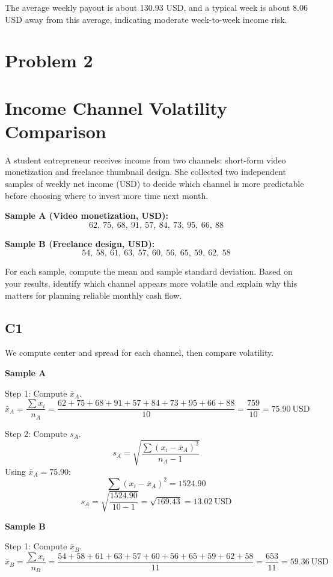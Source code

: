 \begin{ExamProblems}
		The average weekly payout is about 130.93 USD, and a typical week is about 8.06 USD away from this average, indicating moderate week-to-week income risk.

		\newpage
		\item
		\section{Problem 2}
		\section{Income Channel Volatility Comparison}
		A student entrepreneur receives income from two channels: short-form video monetization and freelance thumbnail design. She collected two independent samples of weekly net income (USD) to decide which channel is more predictable before choosing where to invest more time next month.

		\textbf{Sample A (Video monetization, USD):}
		\[62,\ 75,\ 68,\ 91,\ 57,\ 84,\ 73,\ 95,\ 66,\ 88\]

		\textbf{Sample B (Freelance design, USD):}
		\[54,\ 58,\ 61,\ 63,\ 57,\ 60,\ 56,\ 65,\ 59,\ 62,\ 58\]

		For each sample, compute the mean and sample standard deviation. Based on your results, identify which channel appears more volatile and explain why this matters for planning reliable monthly cash flow.

		\subsection*{C1}
		We compute center and spread for each channel, then compare volatility.

		\textbf{Sample A}

		Step 1: Compute $\bar{x}_A$.
		\[
		\bar{x}_A = \frac{\sum x_i}{n_A}
		= \frac{62+75+68+91+57+84+73+95+66+88}{10}
		= \frac{759}{10}
		= 75.90\ \text{USD}
		\]

		Step 2: Compute $s_A$.
		\[
		s_A = \sqrt{\frac{\sum (x_i-\bar{x}_A)^2}{n_A-1}}
		\]
		Using $\bar{x}_A=75.90$:
		\[
		\sum (x_i-\bar{x}_A)^2 = 1524.90
		\]
		\[
		s_A = \sqrt{\frac{1524.90}{10-1}} = \sqrt{169.43} = 13.02\ \text{USD}
		\]

		\textbf{Sample B}

		Step 1: Compute $\bar{x}_B$.
		\[
		\bar{x}_B = \frac{\sum x_i}{n_B}
		= \frac{54+58+61+63+57+60+56+65+59+62+58}{11}
		= \frac{653}{11}
		= 59.36\ \text{USD}
		\]


\end{ExamProblems}
